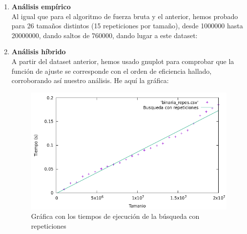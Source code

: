 \documentclass[10pt,a4paper]{article}
\begin{document}
\begin{enumerate}
\item \textbf{Análisis empírico}\\

Al igual que para el algoritmo de fuerza bruta y el anterior, hemos probado para 26 tamaños distintos (15 repeticiones por tamaño), desde 1000000 hasta 20000000, dando saltos de 760000, dando lugar a este dataset:

\begin{table}[h!]
	\centering
	\footnotesize
	\caption{Experiencia empírica de la búsqueda con repeticiones}
\end{table}

\item \textbf{Análisis híbrido}\\

A partir del dataset anterior, hemos usado gnuplot para comprobar que la función de ajuste se corresponde con el orden de eficiencia hallado, corroborando así nuestro análisis. He aquí la gráfica:

 \begin{figure}[h!]
	\centering
	\includegraphics[scale=0.55]{./Images/Grafica_binaria_repes.png}
	\caption{Gráfica con los tiempos de ejecución de la búsqueda con repeticiones}
\end{figure}


\end{enumerate}
\end{document}
